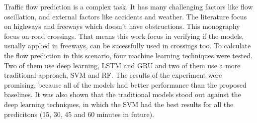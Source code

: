 Traffic flow prediction is a complex task. It has many challenging factors like flow oscillation, and external factors like accidents and weather. The literature focus on highways and freeways which doesn't have obstructions. This monography focus on road crossings. That means this work focus in verifying if the models, usually applied in freeways, can be sucessfully used in crossings too. To calculate the flow prediction in this scenario, four machine learning techniques were tested. Two of them use deep learning, \acrfull{LSTM} and \acrfull{GRU} and two of them use a more traditional approach, \acrfull{SVM} and \acrfull{RF}. The results of the experiment were promising, because all of the models had better performance than the proposed baselines. It was also shown that the traditional models stood out against the deep learning techniques, in which the \acrfull{SVM} had the best results for all the predicitons (15, 30, 45 and 60 minutes in future).



